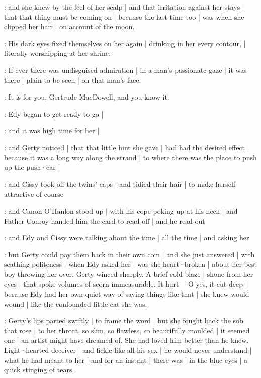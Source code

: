 \gertyReal:
and she knew by the feel of her scalp |
and that irritation against her stays |
that that thing must be coming on |
because the last time too |
was when she clipped her hair |
on account of the moon.

\gertySex:
His dark eyes fixed themselves on her again |
drinking in her every contour, |
literally worshipping at her shrine.

\gertySex:
If ever there was undisguised admiration |
in a man's passionate gaze |
it was there |
plain to be seen |
on that man's face.

\gertyNovel:
It is for you,
Gertrude MacDowell,
and you know it.

\gertyReal:
Edy began to get ready to go |

\gertyJudgy:
and it was high time for her |

\gertyReal:
and Gerty noticed |
that that little hint she gave |
had had the desired effect |
because it was a long way
along the strand |%
to where there was the place
to push up the push·car |

\gertyJudgy:
and Cissy took off the twins' caps |
and tidied their hair |
to make herself attractive of course

\Nrelig:
and Canon O'Hanlon stood up |
with his cope poking up at his neck |
and Father Conroy handed him the card to read off |
and he read out 

:
and Edy and Cissy were talking
about the time |
all the time |
and asking her

\gertyJudgy:
but Gerty could pay them back in their own coin |
and she just answered |
with scathing politeness |
when Edy asked her |
was she heart·broken |
about her best boy throwing her over.
Gerty winced sharply.
A brief cold blaze |
shone from her eyes |
that spoke volumes of scorn immeasurable.
It hurt—%
O yes,
it cut deep |
because Edy had her own quiet way
of saying things like that |%
she knew would wound |
like the confounded little cat
she was.

\gertyNovel:
Gerty's lips parted swiftly |
to frame the word |
but she fought back the sob that rose |
to her throat,
so slim,
so flawless,
so beautifully moulded |
it seemed one |
an artist might have dreamed of.
She had loved him better than he knew.
Light·hearted deceiver |
and fickle like all his sex |
he would never understand |
what he had meant to her |
and for an instant |
there was |
in the blue eyes |
a quick stinging of tears.

